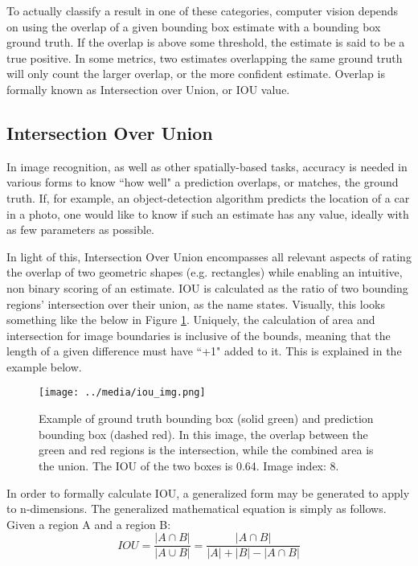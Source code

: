 To actually classify a result in one of these categories, computer vision depends on using the overlap of a given bounding box estimate with a bounding box ground truth. If the overlap is above some threshold, the estimate is said to be a true positive. In some metrics, two estimates overlapping the same ground truth will only count the larger overlap, or the more confident estimate. Overlap is formally known as Intersection over Union, or IOU value.

\subsection{Intersection Over Union}
In image recognition, as well as other spatially-based tasks, accuracy is needed in various forms to know ``how well" a prediction overlaps, or matches, the ground truth. If, for example, an object-detection algorithm predicts the location of a car in a photo, one would like to know if such an estimate has any value, ideally with as few parameters as possible.

In light of this, Intersection Over Union encompasses all relevant aspects of rating the overlap of two geometric shapes (e.g. rectangles) while enabling an intuitive, non binary scoring of an estimate. IOU is calculated as the ratio of two bounding regions' intersection over their union, as the name states. Visually, this looks something like the below in Figure \ref{iou_img}. Uniquely, the calculation of area and intersection for image boundaries is inclusive of the bounds, meaning that the length of a given difference must have ``+1" added to it. This is explained in the example below.

\begin{figure}[ht]
    \texttt{[image: ../media/iou\_img.png]}
    \caption{Example of ground truth bounding box (solid green) and prediction bounding box (dashed red). In this image, the overlap between the green and red regions is the intersection, while the combined area is the union. The IOU of the two boxes is 0.64. Image index: 8.}
    \label{iou_img}
\end{figure}

In order to formally calculate IOU, a generalized form may be generated to apply to n-dimensions. The generalized mathematical equation is simply as follows. Given a region A and a region B:
\begin{equation}
IOU = \frac{|A\cap B|}{|A\cup B|} = \frac{|A\cap B|}{|A|+|B|- |A\cap B|}
\end{equation}


